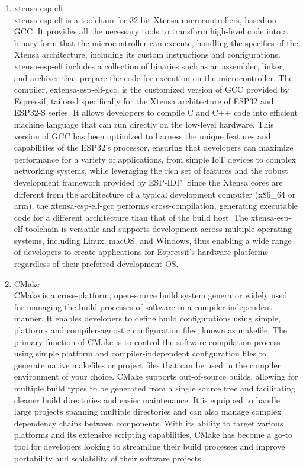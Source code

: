 \documentclass[conference]{IEEEtran}
\begin{document}
\begin{enumerate}[label=\arabic*.]
\begin{enumerate}[label=\alph*.]
\item xtensa-esp-elf\\
xtensa-esp-elf is a toolchain for 32-bit Xtensa microcontrollers, based on GCC. It provides all the necessary tools to transform high-level code into a binary form that the microcontroller can execute, handling the specifics of the Xtensa architecture, including its custom instructions and configurations. xtensa-esp-elf includes a collection of binaries such as an assembler, linker, and archiver that prepare the code for execution on the microcontroller. The compiler, extensa-esp-elf-gcc, is the customized version of GCC provided by Espressif, tailored specifically for the Xtensa architecture of ESP32 and ESP32-S series. It allows developers to compile C and C++ code into efficient machine language that can run directly on the low-level hardware. This version of GCC has been optimized to harness the unique features and capabilities of the ESP32's processor, ensuring that developers can maximize performance for a variety of applications, from simple IoT devices to complex networking systems, while leveraging the rich set of features and the robust development framework provided by ESP-IDF. Since the Xtensa cores are different from the architecture of a typical development computer (x86\_64 or arm), the xtensa-esp-elf-gcc performs cross-compilation, generating executable code for a different architecture than that of the build host. The xtensa-esp-elf toolchain is versatile and supports development across multiple operating systems, including Linux, macOS, and Windows, thus enabling a wide range of developers to create applications for Espressif's hardware platforms regardless of their preferred development OS.\\
\item CMake\\
CMake is a cross-platform, open-source build system generator widely used for managing the build processes of software in a compiler-independent manner. It enables developers to define build configurations using simple, platform- and compiler-agnostic configuration files, known as makefile. The primary function of CMake is to control the software compilation process using simple platform and compiler-independent configuration files to generate native makefiles or project files that can be used in the compiler environment of your choice. CMake supports out-of-source builds, allowing for multiple build types to be generated from a single source tree and facilitating cleaner build directories and easier maintenance. It is equipped to handle large projects spanning multiple directories and can also manage complex dependency chains between components. With its ability to target various platforms and its extensive scripting capabilities, CMake has become a go-to tool for developers looking to streamline their build processes and improve portability and scalability of their software projects.\\

\end{enumerate}
\end{enumerate}
\end{document}
